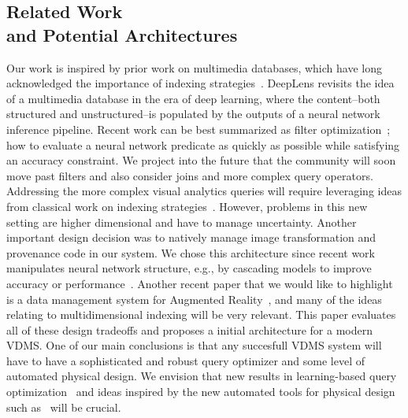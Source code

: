 \subsection{Related Work \\ and Potential Architectures}
Our work is inspired by prior work on multimedia databases, which have long acknowledged the importance of indexing strategies~\cite{yoshitaka1999survey, faloutsos2012searching}.
\textsf{DeepLens} revisits the idea of a multimedia database in the era of deep learning, where the content--both structured and unstructured--is populated by the outputs of a neural network inference pipeline.
Recent work can be best summarized as filter optimization~\cite{kang2017noscope, zhang2018ffs, anderson2018physical, jiang2018chameleon}; how to evaluate a neural network predicate as quickly as possible while satisfying an accuracy constraint.
We project into the future that the community will soon move past filters and also consider joins and more complex query operators.
Addressing the more complex visual analytics queries will require leveraging ideas from classical work on indexing strategies~\cite{faloutsos2012searching}.
However, problems in this new setting are higher dimensional and have to manage uncertainty.
Another important design decision was to natively manage image transformation and provenance code in our system.
We chose this architecture since recent work manipulates neural network structure, e.g., by cascading models to improve accuracy or performance~\cite{kang2017noscope, anderson2018physical, jiang2018mainstream}.
Another recent paper that we would like to highlight is a data management system for Augmented Reality~\cite{haynes2018lightdb}, and many of the ideas relating to multidimensional indexing will be very relevant.
This paper evaluates all of these design tradeoffs and proposes a initial architecture for a modern VDMS.
One of our main conclusions is that any succesfull VDMS system will have to have a sophisticated and robust query optimizer and some level of automated physical design. 
We envision that new results in learning-based query optimization~\cite{kaftan2018cuttlefish,krishnan2018deeprljoins} and ideas inspired by the new automated tools for physical design such as~\cite{sharma2018case,pavlo2017self} will be crucial.











